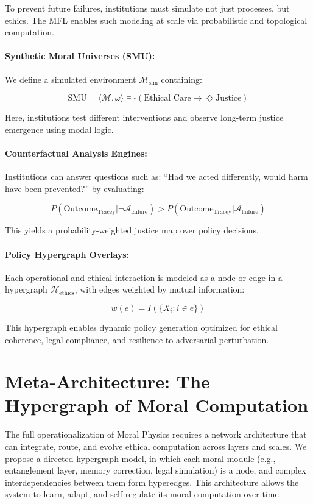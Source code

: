 \documentclass[12]{amsart}
\theoremstyle{plain}
\begin{document}
To prevent future failures, institutions must simulate not just processes, but ethics. The MFL enables such modeling at scale via probabilistic and topological computation.

\paragraph{Synthetic Moral Universes (SMU):}

We define a simulated environment \(\mathcal{M}_{\text{sim}}\) containing:

\[
\text{SMU} = \langle \mathcal{M}, \omega \rangle \models \square (\text{Ethical Care} \rightarrow \Diamond \text{Justice})
\]

Here, institutions test different interventions and observe long-term justice emergence using modal logic.

\paragraph{Counterfactual Analysis Engines:}

Institutions can answer questions such as: “Had we acted differently, would harm have been prevented?” by evaluating:

\[
P(\text{Outcome}_{\text{Tracey}} | \neg \mathcal{A}_\text{failure}) > P(\text{Outcome}_{\text{Tracey}} | \mathcal{A}_\text{failure})
\]

This yields a probability-weighted justice map over policy decisions.

\paragraph{Policy Hypergraph Overlays:}

Each operational and ethical interaction is modeled as a node or edge in a hypergraph \(\mathcal{H}_{\text{ethics}}\), with edges weighted by mutual information:

\[
w(e) = I(\{X_i: i \in e\})
\]

This hypergraph enables dynamic policy generation optimized for ethical coherence, legal compliance, and resilience to adversarial perturbation.

\section{Meta-Architecture: The Hypergraph of Moral Computation}

The full operationalization of Moral Physics requires a network architecture that can integrate, route, and evolve ethical computation across layers and scales. We propose a directed hypergraph model, in which each moral module (e.g., entanglement layer, memory correction, legal simulation) is a node, and complex interdependencies between them form hyperedges. This architecture allows the system to learn, adapt, and self-regulate its moral computation over time.
\end{document}
